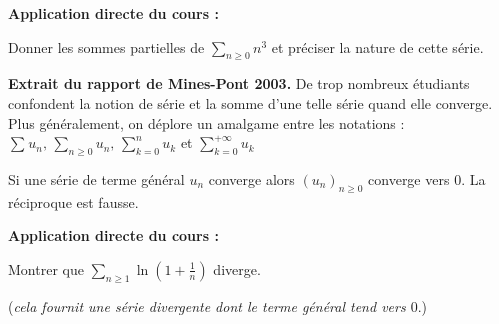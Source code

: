 \documentclass[french,11pt,twoside]{VcCours}
\newenvironment{ApplicationDirecte}{\textbf{Application directe du cours :}

}{}
\newcommand{\Sum}[2]{\ensuremath{\textstyle{\sum\limits_{#1}^{#2}}}}
\begin{document}
\begin{ApplicationDirecte} Donner les sommes partielles de $\Sum{n \geq 0}{} n^3$ et préciser la nature de cette série.
\end{ApplicationDirecte} 

\textbf{Extrait du rapport de Mines-Pont 2003.} \og De trop nombreux étudiants confondent la notion de série et la somme d'une telle série quand elle converge.  Plus généralement, on déplore un amalgame entre les notations : $\Sum{}{} u_n, \,  \Sum{n \geq 0}{} u_n,  \, \Sum{k = 0}{n} u_k$ et $\Sum{k =0}{+ \infty} u_k$ \fg 

\medskip


\begin{Theoreme}{} Si une série de terme général $u_n$ converge alors $(u_n)_{n \geq 0}$ converge vers $0$. La réciproque est fausse. \end{Theoreme}

\begin{Demonstration}{} 

\vspace{4cm}
%
%
\end{Demonstration}

\begin{ApplicationDirecte} Montrer que $\Sum{n\geq 1}{} \ln \left(1 + \frac{1}{n} \right)$ diverge.
	
	(\emph{cela fournit une série divergente dont le terme général tend vers $0$}.)
\end{ApplicationDirecte}
\end{document}
